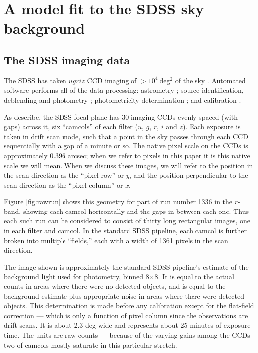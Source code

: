 \documentclass[10pt,preprint]{aastex}
\begin{document}
\section{A model fit to the SDSS sky background}
\label{sec:model}

\subsection{The SDSS imaging data}
\label{sec:data}

The SDSS has taken $ugriz$ CCD imaging of $>10^4~\mathrm{deg^2}$ of
the sky \citep{york00a,abazajian09a}.  Automated software performs all
of the data processing: astrometry \citep{pier03a}; source
identification, deblending and photometry \citep{lupton01a};
photometricity determination \citep{hogg01a}; and calibration
\citep{fukugita96a,smith02a, padmanabhan07b}.

As \citet{gunn05a} describe, the SDSS focal plane has 30 imaging CCDs
evenly spaced (with gaps) across it, six ``camcols'' of each filter
($u$, $g$, $r$, $i$ and $z$). Each exposure is taken in drift scan
mode, such that a point in the sky passes through each CCD
sequentially with a gap of a minute or so.  The native pixel scale on
the CCDs is approximately 0.396 arcsec; when we refer to pixels in
this paper it is this native scale we will mean. When we discuss these
images, we will refer to the position in the scan direction as the
``pixel row'' or $y$, and the position perpendicular to the scan
direction as the ``pixel column'' or $x$.

Figure \ref{fig:rawrun} shows this geometry for part of run number
1336 in the $r$-band, showing each camcol horizontally and the gaps in
between each one. Thus each such run can be considered to consist of
thirty long rectangular images, one in each filter and camcol. In the
standard SDSS pipeline, each camcol is further broken into multiple
``fields,'' each with a width of 1361 pixels in the scan direction.

The image shown is approximately the standard SDSS pipeline's estimate
of the background light used for photometry, binned 8$\times$8. It is
equal to the actual counts in areas where there were no detected
objects, and is equal to the background estimate plus appropriate
noise in areas where there were detected objects. This determination
is made before any calibration except for the flat-field correction
--- which is only a function of pixel column since the observations
are drift scans.  It is about 2.3 deg wide and represents about 25
minutes of exposure time. The units are raw counts --- because of the
varying gains among the CCDs two of camcols mostly saturate in this
particular stretch.
\end{document}
